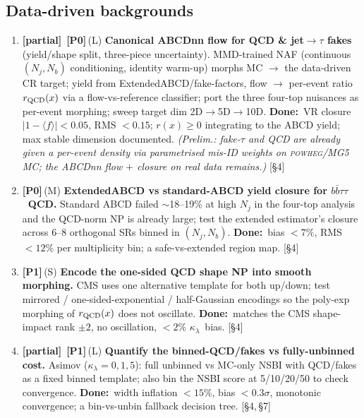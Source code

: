 \documentclass[11pt]{article}
\newcommand{\kl}{\ensuremath{\kappa_\lambda}}
\newcommand{\bbtt}{\ensuremath{b\bar b\tau\tau}}
\newcommand{\priZ}{\textcolor{red!75!black}{\textbf{[P0]}}}
\newcommand{\priO}{\textcolor{orange!85!black}{\textbf{[P1]}}}
\newcommand{\eff}[1]{{\footnotesize\textcolor{gray!65!black}{(#1)}}}
\newcommand{\sref}[1]{ {\footnotesize\textcolor{gray!60!black}{[#1]}}}
\newcommand{\dw}{\textcolor{green!30!black}{\textbf{Done:}}~}
\newcommand{\stPart}{\textcolor{orange!90!black}{\textbf{[partial]}}}
\begin{document}
\subsection*{Data-driven backgrounds}
\begin{enumerate}[leftmargin=2.6em]\small
\item \stPart\ \priZ\,\eff{L} \textbf{Canonical ABCDnn flow for QCD \& jet$\to\tau$ fakes} (yield/shape split, three-piece
uncertainty). MMD-trained NAF (continuous $(N_j,N_b)$ conditioning, identity warm-up) morphs MC $\to$ the
data-driven CR target; yield from ExtendedABCD/fake-factors, flow $\to$ per-event ratio $r_{\rm QCD}(x)$ via a
flow-vs-reference classifier; port the three four-top nuisances as per-event morphing; sweep target dim
2D$\to$5D$\to$10D. \dw VR closure $|1-\langle f\rangle|<0.05$, RMS $<0.15$; $r(x)\ge0$ integrating to the ABCD
yield; max stable dimension documented. \textcolor{orange!75!black}{\emph{\small(Prelim.: fake-$\tau$ and QCD are
already given a per-event density via parametrised mis-ID \emph{weights} on \textsc{powheg}/MG5 MC; the ABCDnn flow
$+$ closure on real data remains.)}} \sref{\S4}
\item \priZ\,\eff{M} \textbf{ExtendedABCD vs standard-ABCD yield closure for \bbtt\ QCD.} Standard ABCD failed
$\sim$18--19\% at high $N_j$ in the four-top analysis and the QCD-norm NP is already large; test the extended
estimator's closure across 6--8 orthogonal SRs binned in $(N_j,N_b)$. \dw bias $<7\%$, RMS $<12\%$ per
multiplicity bin; a safe-vs-extended region map. \sref{\S4}
\item \priO\,\eff{S} \textbf{Encode the one-sided QCD shape NP into smooth morphing.} CMS uses one alternative
template for both up/down; test mirrored / one-sided-exponential / half-Gaussian encodings so the poly-exp
morphing of $r_{\rm QCD}(x)$ does not oscillate. \dw matches the CMS shape-impact rank $\pm2$, no oscillation,
$<2\%$ \kl\ bias. \sref{\S4}
\item \stPart\ \priO\,\eff{L} \textbf{Quantify the binned-QCD/fakes vs fully-unbinned cost.} Asimov (\kl$=0,1,5$): full
unbinned vs MC-only NSBI with QCD/fakes as a fixed binned template; also bin the NSBI score at 5/10/20/50 to check
convergence. \dw width inflation $<15\%$, bias $<0.3\sigma$, monotonic convergence; a bin-vs-unbin fallback
decision tree. \sref{\S4,\,\S7}
\end{enumerate}
\end{document}
